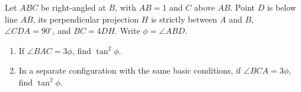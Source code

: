Let $ABC$ be right-angled at $B$, with $AB=1$ and $C$ above $AB$. Point $D$ is below line $AB$, its perpendicular projection $H$ is strictly between $A$ and $B$, $\angle CDA=90^\circ$, and $BC=4DH$. Write $\phi=\angle ABD$.
\begin{enumerate}
\item If $\angle BAC=3\phi$, find $\tan^2\phi$.
\item In a separate configuration with the same basic conditions, if $\angle BCA=3\phi$, find $\tan^2\phi$.
\end{enumerate}

